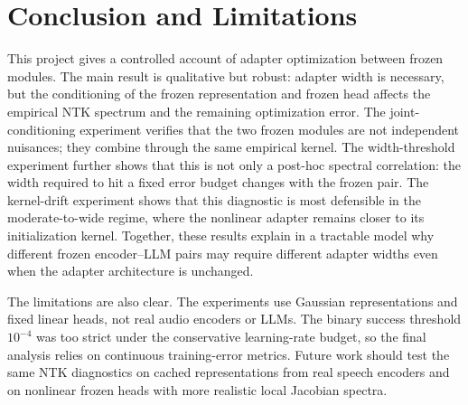 \documentclass[10pt,a4paper]{article}
\begin{document}
\section{Conclusion and Limitations}
This project gives a controlled account of adapter optimization between frozen modules.  The main result
is qualitative but robust: adapter width is necessary, but the conditioning of the frozen representation
and frozen head affects the empirical NTK spectrum and the remaining optimization error.  The
joint-conditioning experiment verifies that the two frozen modules are not independent nuisances; they
combine through the same empirical kernel.  The width-threshold experiment further shows that this is not
only a post-hoc spectral correlation: the width required to hit a fixed error budget changes with the
frozen pair.  The kernel-drift experiment shows that this diagnostic is most defensible in the
moderate-to-wide regime, where the nonlinear adapter remains closer to its initialization kernel.
Together, these results explain in a tractable model why different frozen encoder--LLM pairs may require
different adapter widths even
when the adapter architecture is unchanged.

The limitations are also clear.  The experiments use Gaussian representations and fixed linear heads,
not real audio encoders or LLMs.  The binary success threshold $10^{-4}$ was too strict under the
conservative learning-rate budget, so the final analysis relies on continuous training-error metrics.
Future work should test the same NTK diagnostics on cached representations from real speech encoders and
on nonlinear frozen heads with more realistic local Jacobian spectra.

\clearpage


\end{document}
